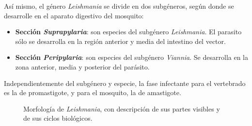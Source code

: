 Así mismo, el género \textit{Leishmania} se divide en dos subgéneros, según donde se desarrolle en el aparato digestivo del mosquito:
\begin{itemize}[itemsep=0pt,parsep=0pt,topsep=0pt,partopsep=0pt] 
	\item \textbf{Sección \textit{Suprapylaria}}: son especies del subgénero \textit{Leishmania}. El parasito sólo se desarrolla en la región anterior y media del intestino del vector.
	\item \textbf{Sección \textit{Peripylaria}}: son especies del subgénero \textit{Viannia}. Se desarrolla en la zona anterior, media y posterior del parásito.
\end{itemize}

Independientemente del subgénero y especie, la fase infectante para el vertebrado es la de promastigote, y para el mosquito, la de amastigote.
\begin{figure}[htpb]
	\centering
	\caption[Morfología de \textit{Leishmania}]{Morfología de \textit{Leishmania}, con descripción de sus partes visibles y de sus ciclos biológicos. \label{fig:PARASIT:LeishmaniaMorf}}
\end{figure}
